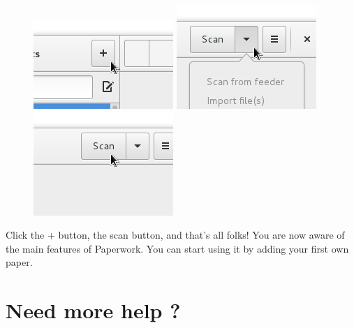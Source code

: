 \documentclass[10pt,a4paper]{article}
\begin{document}
\begin{figure}[h]
	\centering
	\includegraphics[scale=0.5]{data/new_doc.png}
	\includegraphics[scale=0.5]{data/paperwork_import.png}
	\includegraphics[scale=0.5]{data/paperwork_scan.png}
\end{figure}

Click the + button, the scan button, and that's all folks! You are now aware
of the main features of Paperwork. You can start using it by adding your first
own paper.


\section{Need more help ?}
\end{document}

